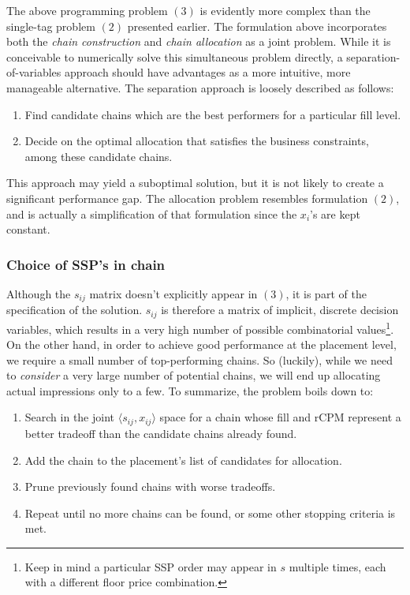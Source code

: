 \documentclass{article}
\begin{document}
\begin{large}
The above programming problem $(3)$ is evidently more complex than the single-tag problem $(2)$ presented earlier. The formulation above incorporates both the \emph{chain construction} and \emph{chain allocation} as a joint problem. While it is conceivable to numerically solve this simultaneous problem directly, a separation-of-variables approach should have advantages as a more intuitive, more manageable alternative. The separation approach is loosely described as follows:
\begin{enumerate}
\item Find candidate chains which are the best performers for a particular fill level.
\item Decide on the optimal allocation that satisfies the business constraints, among these candidate chains.
\end{enumerate}
This approach may yield a suboptimal solution, but it is not likely to create a significant performance gap.
The allocation problem resembles formulation $(2)$, and is actually a simplification of that formulation since the $x_i$'s are kept constant.

\subsubsection{Choice of SSP's in chain}
Although the $s_{ij}$ matrix doesn't explicitly appear in $(3)$, it is part of the specification of the solution. $s_{ij}$ is therefore a matrix of implicit, discrete decision variables, which results in a very high number of possible combinatorial values\footnote{Keep in mind a particular SSP order may appear in $s$ multiple times, each with a different floor price combination.}. On the other hand, in order to achieve good performance at the placement level, we require a small number of top-performing chains. So (luckily), while we need to \emph{consider} a very large number of potential chains, we will end up allocating actual impressions only to a few. To summarize, the problem boils down to: 
\begin{enumerate}
\item Search in the joint $ \big \langle s_{ij},x_{ij} \big \rangle $ space for a chain whose fill and rCPM represent a better tradeoff than the candidate chains already found.
\item Add the chain to the placement's list of candidates for allocation.
\item Prune previously found chains with worse tradeoffs.
\item Repeat until no more chains can be found, or some other stopping criteria is met.
\end{enumerate}


\end{large}
\end{document}
